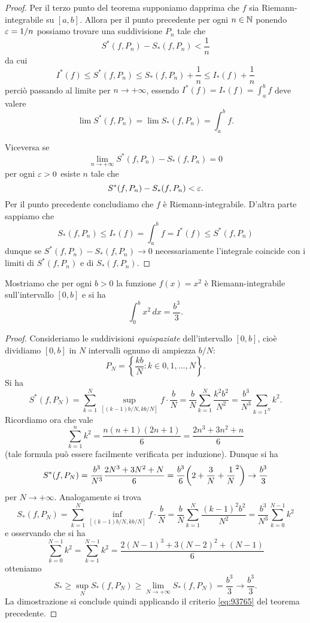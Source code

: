 \begin{proof}
Per il terzo punto del teorema
supponiamo dapprima che $f$ sia Riemann-integrabile su $[a,b]$.
Allora per il punto precedente per ogni $n\in \mathbb N$ ponendo $\varepsilon=1/n$ possiamo trovare una suddivisione $P_n$ tale che
\[
  S^*(f,P_n) - S_*(f,P_n) < \frac 1 n
\]
da cui
\[
  I^*(f) \le S^*(f,P_n) \le S_*(f,P_n) + \frac 1 n
   \le I_*(f) + \frac 1 n
\]
perciò passando al limite per $n\to +\infty$,
essendo $I^*(f) = I_*(f) = \int_a^b f$ deve valere
\[
  \lim S^*(f,P_n) = \lim S_*(f,P_n) = \int_a^b f.
\]

Viceversa se
\[
 \lim_{n\to +\infty} S^*(f,P_n) - S_*(f,P_n) = 0
\]
per ogni $\varepsilon>0$ esiste $n$ tale che
\[
  S^*(f,P_n) - S_*(f,P_n) < \varepsilon.
\]
Per il punto precedente concludiamo che $f$ è Riemann-integrabile.
D'altra parte sappiamo che
\[
  S_*(f,P_n) \le I_*(f) = \int_a^b f = I^*(f) \le S^*(f,P_n)
\]
dunque se $S^*(f,P_n) - S_*(f,P_n) \to 0$ necessariamente
l'integrale coincide con i limiti di $S^*(f,P_n)$ e di
$S_*(f,P_n)$.
\end{proof}

\begin{example}
\label{ex:integrale_quadrato}
Mostriamo che per ogni $b>0$ la funzione $f(x)=x^2$ è Riemann-integrabile sull'intervallo $[0,b]$ e si ha
\[
 \int_0^b x^2\, dx = \frac{b^3}{3}.
\]
\end{example}
\begin{proof}
Consideriamo le suddivisioni \emph{equispaziate} dell'intervallo $[0,b]$, cioè dividiamo $[0,b]$ in $N$ intervalli ognuno di ampiezza $b/N$:
\[
P_N = \left\{\frac{kb}{N}\colon k \in 0, 1, \dots, N\right\}.
\]
Si ha
\[
  S^*(f,P_N) = \sum_{k=1}^N \sup_{[(k-1)b/N,kb/N]}f \cdot \frac b N
   = \frac{b}{N} \sum_{k=1}^N \frac{k^2b^2}{N^2}
   = \frac{b^3}{N^3} \sum_{k=1^N} k^2.
\]
Ricordiamo ora che vale
\[
  \sum_{k=1}^n k^2 = \frac{n(n+1)(2n+1)}{6} = \frac{2n^3+3n^2+n}{6}
\]
(tale formula può essere facilmente verificata per induzione). Dunque si ha
\[
  S^*(f,P_N) = \frac{b^3}{N^3} \frac{2N^3+3N^2+N}{6}
       = \frac{b^3}{6}{\left( 2 + \frac{3}{N}+\frac 1 N^2 \right)}
       \to \frac{b^3}{3}
\]
per $N\to +\infty$.
Analogamente si trova
\[
  S_*(f,P_N) = \sum_{k=1}^N \inf_{[(k-1)b/N,kb/N]} f \cdot \frac{b}{N}
  = \frac{b}{N}\sum_{k=1}^N \frac{(k-1)^2b^2}{N^2}
  = \frac{b^3}{N^3} \sum_{k=0}^{N-1} k^2
\]
e osservando che si ha
\[
 \sum_{k=0}^{N-1} k^2 = \sum_{k=1}^{N-1} k^2 = \frac{2(N-1)^3+3(N-2)^2+(N-1)}{6}
\]
otteniamo
\[
 S_*\ge \sup_N S_*(f,P_N) \ge \lim_{N\to+\infty} S_*(f,P_N) = \frac{b^3}{3} \to \frac{b^3}{3}.
\]
La dimostrazione si conclude quindi applicando
il criterio \eqref{eq:93765} del teorema precedente.
\end{proof}

